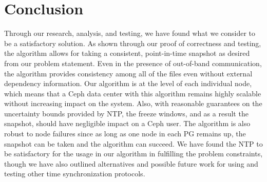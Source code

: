 \chapter{Conclusion}
\label{sec:conclusion}

Through our research, analysis, and testing, we have found what we
consider to be a satisfactory solution. As shown through our proof of
correctness and testing, the algorithm allows for taking a consistent,
point-in-time snapshot as desired from our problem statement. Even in
the presence of out-of-band communication, the algorithm provides
consistency among all of the files even without external dependency
information. Our algorithm is at the level of each individual node,
which means that a Ceph data center with this algorithm remains highly
scalable without increasing impact on the system. Also, with
reasonable guarantees on the uncertainty bounds provided by NTP, the
freeze windows, and as a result the snapshot, should have negligible
impact on a Ceph user. The algorithm is also robust to node failures
since as long as one node in each PG remains up, the snapshot can be
taken and the algorithm can succeed. We have found the NTP to be
satisfactory for the usage in our algorithm in fulfilling the problem
constraints, though we have also outlined alternatives and possible
future work for using and testing other time synchronization
protocols.
